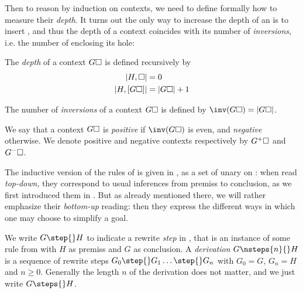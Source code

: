\begin{scope}
Then to reason by induction on contexts, we need to define formally how to
measure their \emph{depth}. It turns out the only way to increase the depth of
an  is to insert \emph{}, and thus the depth of a
context coincides with its number of \emph{inversions}, i.e. the number of
 enclosing its hole:

\begin{definition}[Depth]
  The \emph{depth} of a context $G\square$ is defined recursively by
  \begin{align*}
    \left|H, \square\right| &= 0 \\
    \left|H, [G\square]\right| &= \left|G\square\right| + 1
  \end{align*}
\end{definition}

\begin{definition}[Inversions]

  The number of \emph{inversions} of a context $G\square$ is defined by
  $\inv(G\hole) = \gdepth{G\hole}$.
\end{definition}

\begin{definition}[Polarity]
  We say that a context $G\square$ is \emph{positive} if $\inv(G\hole)$ is
  even, and \emph{negative} otherwise. We denote positive and negative contexts
  respectively by $G^+\square$ and $G^-\square$.
\end{definition}

The inductive version of the rules of  is given in , as
a set of unary  on : when read \emph{top-down},
they correspond to usual inferences from premiss to conclusion, as we first
introduced them in .
But as already mentioned there, we will rather emphasize their \emph{bottom-up}
reading: then they express the different ways in which one may choose to
simplify a goal.

\begin{definition}[Derivation]
  We write $G \step{} H$ to indicate a rewrite \emph{step} in , that is
  an instance of some rule from  with $H$ as premiss and $G$ as
  conclusion. A \emph{derivation} $G \nsteps{n}{} H$ is a sequence of rewrite
  steps $G_0 \step{} G_1 \ldots \step{} G_n$ with $G_0 = G$, $G_n = H$ and $n \geq
  0$. Generally the length $n$ of the derivation does not matter, and we just
  write $G \steps{} H$.
\end{definition}


\end{scope}
